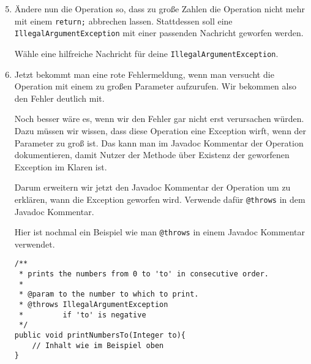 \begin{enumerate}\setcounter{enumi}{4}
	\item
	Ändere nun die Operation so, dass zu große Zahlen die Operation nicht mehr mit einem \lstinline{return;} abbrechen lassen.
	Stattdessen soll eine \lstinline{IllegalArgumentException} mit einer passenden Nachricht geworfen werden.
	
	Wähle eine hilfreiche Nachricht für deine \lstinline{IllegalArgumentException}.
	
	\item
	Jetzt bekommt man eine rote Fehlermeldung, wenn man versucht die Operation mit einem zu großen Parameter aufzurufen.
	Wir bekommen also den Fehler deutlich mit.
	
	Noch besser wäre es, wenn wir den Fehler gar nicht erst verursachen würden.
	Dazu müssen wir wissen, dass diese Operation eine Exception wirft, wenn der Parameter zu groß ist.
	Das kann man im Javadoc Kommentar der Operation dokumentieren, damit Nutzer der Methode über Existenz der geworfenen Exception im Klaren ist.
	
	Darum erweitern wir jetzt den Javadoc Kommentar der Operation um zu erklären, wann die Exception geworfen wird.
	Verwende dafür \lstinline{@throws} in dem Javadoc Kommentar.
	
	Hier ist nochmal ein Beispiel wie man \lstinline{@throws} in einem Javadoc Kommentar verwendet.

		\begin{lstlisting}
/**
 * prints the numbers from 0 to 'to' in consecutive order.
 *
 * @param to the number to which to print.
 * @throws IllegalArgumentException
 *         if 'to' is negative
 */
public void printNumbersTo(Integer to){
    // Inhalt wie im Beispiel oben
}
		\end{lstlisting}
\end{enumerate}
\newpage
